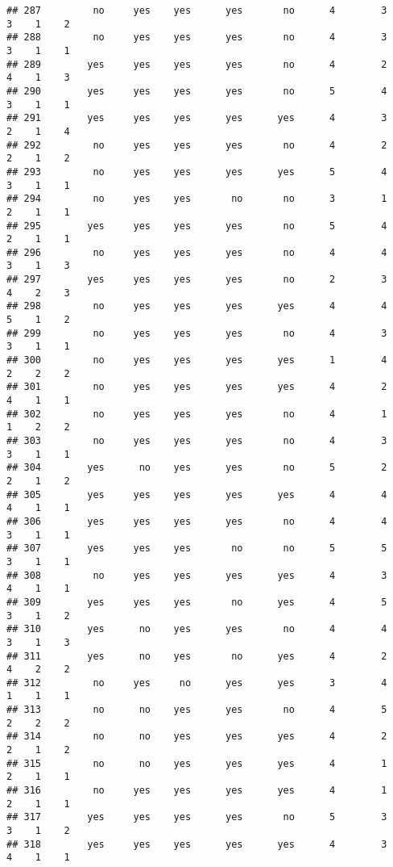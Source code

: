 \documentclass[
]{article}
\begin{document}
\begin{verbatim}
## 287         no     yes    yes      yes       no      4        3     3    1    2
## 288         no     yes    yes      yes       no      4        3     3    1    1
## 289        yes     yes    yes      yes       no      4        2     4    1    3
## 290        yes     yes    yes      yes       no      5        4     3    1    1
## 291        yes     yes    yes      yes      yes      4        3     2    1    4
## 292         no     yes    yes      yes       no      4        2     2    1    2
## 293         no     yes    yes      yes      yes      5        4     3    1    1
## 294         no     yes    yes       no       no      3        1     2    1    1
## 295        yes     yes    yes      yes       no      5        4     2    1    1
## 296         no     yes    yes      yes       no      4        4     3    1    3
## 297        yes     yes    yes      yes       no      2        3     4    2    3
## 298         no     yes    yes      yes      yes      4        4     5    1    2
## 299         no     yes    yes      yes       no      4        3     3    1    1
## 300         no     yes    yes      yes      yes      1        4     2    2    2
## 301         no     yes    yes      yes      yes      4        2     4    1    1
## 302         no     yes    yes      yes       no      4        1     1    2    2
## 303         no     yes    yes      yes       no      4        3     3    1    1
## 304        yes      no    yes      yes       no      5        2     2    1    2
## 305        yes     yes    yes      yes      yes      4        4     4    1    1
## 306        yes     yes    yes      yes       no      4        4     3    1    1
## 307        yes     yes    yes       no       no      5        5     3    1    1
## 308         no     yes    yes      yes      yes      4        3     4    1    1
## 309        yes     yes    yes       no      yes      4        5     3    1    2
## 310        yes      no    yes      yes       no      4        4     3    1    3
## 311        yes      no    yes       no      yes      4        2     4    2    2
## 312         no     yes     no      yes      yes      3        4     1    1    1
## 313         no      no    yes      yes       no      4        5     2    2    2
## 314         no      no    yes      yes      yes      4        2     2    1    2
## 315         no      no    yes      yes      yes      4        1     2    1    1
## 316         no     yes    yes      yes      yes      4        1     2    1    1
## 317        yes     yes    yes      yes       no      5        3     3    1    2
## 318        yes     yes    yes      yes      yes      4        3     4    1    1

\end{verbatim}
\end{document}
